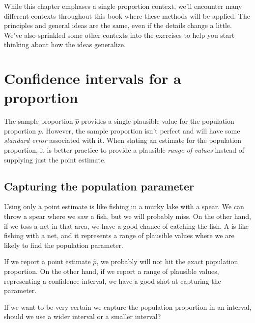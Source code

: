 While this chapter emphases a single proportion
context, we'll encounter many different contexts
throughout this book where these methods will be
applied.
The principles and general ideas are the same,
even if the details change a little.
We've also sprinkled some other contexts into
the exercises to help you start thinking about
how the ideas generalize.


{}





\section{Confidence intervals for a proportion}
\label{confidenceIntervals}


The sample proportion $\hat{p}$ provides a single plausible value
for the population proportion $p$. However, the sample proportion
isn't perfect and will have some \emph{standard error}
associated with it.
When stating an estimate for the population  proportion,
it is better practice to provide a plausible
\emph{range of values} instead of supplying just the point
estimate.


\subsection{Capturing the population parameter}

Using only a point estimate is like fishing in a murky
lake with a spear. We can throw a spear where we
saw a fish, but we will probably miss. On the other hand,
if we toss a net in that area, we have a good chance of
catching the fish.
A  is like fishing with a net,
and it represents a range of plausible values where we
are likely to find the population parameter.

If we report a point estimate $\hat{p}$, we probably
will not hit the exact population proportion. On the
other hand, if we report a range of plausible values,
representing a confidence interval,
we have a good shot at capturing the parameter.

\begin{exercisewrap}
\begin{nexercise}
If we want to be very certain we capture the population
proportion in an interval, should we use a wider interval
or a smaller interval?\footnotemark
\end{nexercise}
\end{exercisewrap}

